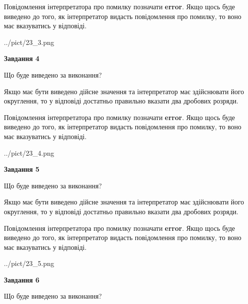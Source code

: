 \documentclass[12pt, ukrainian]{article}
\begin{document}
{\begin {Large}
Повідомлення інтерпретатора про помилку позначати \textbf{error}.
Якщо щось буде виведено до того, як інтерпретатор видасть повідомлення про помилку, 
то воно має вказуватись у відповіді. \par

\begin{center}
	{../pict/23_3.png}
\end{center}
\newpage

{\begin {center}\textbf{Завдання 4}\end {center}}\par
Що буде виведено за виконання? \par

Якщо має бути виведено дійсне значення та інтерпретатор має здійснювати його округлення, 
то у відповіді достатньо правильно вказати два дробових розряди.

Повідомлення інтерпретатора про помилку позначати \textbf{error}.
Якщо щось буде виведено до того, як інтерпретатор видасть повідомлення про помилку, 
то воно має вказуватись у відповіді. \par

\begin{center}
	{../pict/23_4.png}
\end{center}
\newpage

{\begin {center}\textbf{Завдання 5}\end {center}}\par
Що буде виведено за виконання? \par

Якщо має бути виведено дійсне значення та інтерпретатор має здійснювати його округлення, 
то у відповіді достатньо правильно вказати два дробових розряди.

Повідомлення інтерпретатора про помилку позначати \textbf{error}.
Якщо щось буде виведено до того, як інтерпретатор видасть повідомлення про помилку, 
то воно має вказуватись у відповіді. \par

\begin{center}
	{../pict/23_5.png}
\end{center}
\newpage

{\begin {center}\textbf{Завдання 6}\end {center}}\par
Що буде виведено за виконання? \par


\end{Large}}
\end{document}
